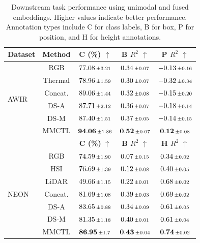 \documentclass[lettersize,journal]{IEEEtran}
\begin{document}
\begin{table}[t]
\centering
\caption{
Downstream task performance using unimodal and fused embeddings. Higher values indicate better performance. Annotation types include C for class labels, B for box, P for position, and H for height annotations.
}
\label{tab:downstream_performance_tasks}
\begin{tabular}{l c c c c}
\toprule
\textbf{Dataset} & \textbf{Method}
& \textbf{C (\%)} $\uparrow$
& \textbf{B $R^2$} $\uparrow$
& \textbf{P $R^2$} $\uparrow$ \\
\midrule
\multirow{6}{*}{AWIR}
& RGB        
& $77.08 \,\scriptstyle\pm\,\!3.21$ 
& $0.34 \,\scriptstyle\pm\,\!0.07$ 
& $-0.13 \,\scriptstyle\pm\,\!0.16$ \\
& Thermal    
& $78.96\,\scriptstyle\pm\,\!1.59$ 
& $0.30\,\scriptstyle\pm\,\!0.07$ 
& $-0.32 \,\scriptstyle\pm\,\!0.34$ \\
\cmidrule(lr){2-5}
& Concat.    
& $89.06 \,\scriptstyle\pm\,\!1.44$ 
& $0.32\,\scriptstyle\pm\,\!0.08$ 
& $-0.15 \,\scriptstyle\pm\,\!0.20$ \\
& DS-A  
& $87.71 \,\scriptstyle\pm\,\!2.12$ 
& $0.36\,\scriptstyle\pm\,\!0.07$ 
& $-0.18 \,\scriptstyle\pm\,\!0.14$ \\
& DS-M    
& $87.40 \,\scriptstyle\pm\,\!1.51$ 
& $0.37\,\scriptstyle\pm\,\!0.05$ 
& $-0.14 \,\scriptstyle\pm\,\!0.15$ \\
\cmidrule(lr){2-5}
& MMCTL      
& $\mathbf{94.06}\,\scriptstyle\pm\,\!1.86$ 
& $\mathbf{0.52}\,\scriptstyle\pm\,\!0.07$ 
& $\mathbf{0.12 }\,\scriptstyle\pm\,\!0.08$ \\
\midrule
\multicolumn{2}{l}{}
& \textbf{C (\%)} $\uparrow$
& \textbf{B $R^2$} $\uparrow$
& \textbf{H $R^2$} $\uparrow$ \\
\midrule
\multirow{7}{*}{NEON}
& RGB        
& $74.59\,\scriptstyle\pm\,\!1.90$ 
& $0.07 \,\scriptstyle\pm\,\!0.15$ 
& $0.34 \,\scriptstyle\pm\,\!0.02$ \\
& HSI        
& $76.69 \,\scriptstyle\pm\,\!1.39$ 
& $0.12 \,\scriptstyle\pm\,\!0.08$ 
& $0.40\,\scriptstyle\pm\,\!0.05$ \\
& LiDAR      
& $49.66 \,\scriptstyle\pm\,\!1.15$ 
& $0.22 \,\scriptstyle\pm\,\!0.01$ 
& $0.68 \,\scriptstyle\pm\,\!0.02$ \\
\cmidrule(lr){2-5}
& Concat.    
& $81.69 \,\scriptstyle\pm\,\!1.08$ 
& $0.39 \,\scriptstyle\pm\,\!0.03$ 
& $0.69 \,\scriptstyle\pm\,\!0.02$ \\
& DS-A  
& $83.65 \,\scriptstyle\pm\,\!0.88$ 
& $0.34 \,\scriptstyle\pm\,\!0.09$ 
& $0.61 \,\scriptstyle\pm\,\!0.05$ \\
& DS-M    
& $81.35 \,\scriptstyle\pm\,\!1.18$ 
& $0.40\,\scriptstyle\pm\,\!0.01$ 
& $0.61 \,\scriptstyle\pm\,\!0.04$ \\
\cmidrule(lr){2-5}  
& MMCTL      
& $\mathbf{86.95} \,\scriptstyle\pm\,\!1.7$ 
& $\mathbf{0.43} \,\scriptstyle\pm\,\!0.04$ 
& $\mathbf{0.74} \,\scriptstyle\pm\,\!0.02$ \\
\bottomrule
\end{tabular}
\end{table}
\end{document}
